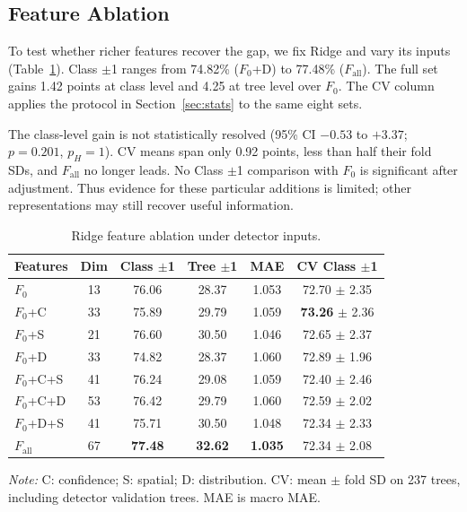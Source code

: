 \documentclass[conference,a4paper]{IEEEtran}
\begin{document}
\subsection{Feature Ablation}
\label{sec:ablation}
To test whether richer features recover the gap, we fix Ridge and vary its
inputs (Table~\ref{tab:ablation}). Class $\pm$1 ranges from 74.82\% ($F_0$+D)
to 77.48\% ($F_{\text{all}}$). The full set gains 1.42 points at class level
and 4.25 at tree level over $F_0$. The CV column applies the protocol in
Section~\ref{sec:stats} to the same eight sets.

The class-level gain is not statistically resolved (95\% CI $-0.53$ to
$+3.37$; $p=0.201$, $p_H=1$). CV means span only 0.92 points, less than half
their fold SDs, and $F_{\text{all}}$ no longer leads. No Class $\pm$1 comparison
with $F_0$ is significant after adjustment. Thus evidence for these particular
additions is limited; other representations may still recover useful information.

\begin{table}[!tb]
  \centering
  \footnotesize
  \renewcommand{\arraystretch}{1.13}
  \setlength{\tabcolsep}{3pt}
  \caption{Ridge feature ablation under detector inputs.}
  \label{tab:ablation}
  \begin{tabular*}{\columnwidth}{@{\extracolsep{\fill}}lccccc@{}}
    \toprule
    Features & Dim & Class $\pm$1 & Tree $\pm$1 & MAE & CV Class $\pm$1 \\
    \midrule
    $F_0$        & 13 & 76.06          & 28.37          & 1.053          & 72.70 $\pm$ 2.35 \\
    $F_0$+C      & 33 & 75.89          & 29.79          & 1.059          & \textbf{73.26} $\pm$ 2.36 \\
    $F_0$+S      & 21 & 76.60          & 30.50          & 1.046          & 72.65 $\pm$ 2.37 \\
    $F_0$+D      & 33 & 74.82          & 28.37          & 1.060          & 72.89 $\pm$ 1.96 \\
    $F_0$+C+S    & 41 & 76.24          & 29.08          & 1.059          & 72.40 $\pm$ 2.46 \\
    $F_0$+C+D    & 53 & 76.42          & 29.79          & 1.060          & 72.59 $\pm$ 2.02 \\
    $F_0$+D+S    & 41 & 75.71          & 30.50          & 1.048          & 72.34 $\pm$ 2.33 \\
    $F_{\text{all}}$ & 67 & \textbf{77.48} & \textbf{32.62} & \textbf{1.035} & 72.34 $\pm$ 2.08 \\
    \bottomrule
  \end{tabular*}
\par\vspace{3pt}
  \begin{minipage}{\columnwidth}
    \footnotesize\raggedright
    \textit{Note:} C: confidence; S: spatial; D: distribution. CV: mean $\pm$ fold SD on 237 trees, including detector validation trees. MAE is macro MAE.
  \end{minipage}
\end{table}
\end{document}
